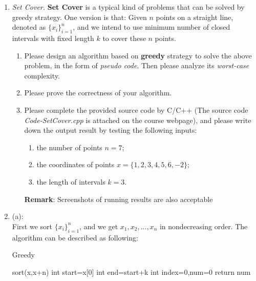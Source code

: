\documentclass[12pt,a4paper]{article}
\makeatletter
\newtheorem*{solution}{Solution}
\theoremstyle{definition}
\renewenvironment{solution}[1][Solution] {\par\pushQED{\qed}\normalfont\topsep6\p@\@plus6\p@\relax\trivlist\item[\hskip\labelsep\bfseries#1\@addpunct{.}]\ignorespaces}{\popQED\endtrivlist\@endpefalse} \makeatother
\makeatother
\begin{document}
\begin{enumerate}
    \item \textit{Set Cover.} \textbf{Set Cover} is a typical kind of problems that can be solved by greedy strategy. One version is that: Given $n$ points on a straight line, denoted as $\{x_i\}_{i=1}^n$, and we intend to use minimum number of closed intervals with fixed length $k$ to cover these $n$ points.
    \begin{enumerate}
    	\item Please design an algorithm based on \textbf{greedy} strategy to solve the above problem, in the form of \emph{pseudo code}. Then please analyze its \emph{worst-case} complexity.
    	\item Please prove the correctness of your algorithm.
    	\item Please complete the provided source code by C/C++ {\color{blue}(The source code \emph{Code-SetCover.cpp} is attached on the course webpage)}, and please write down the output result by testing the following inputs: 
    	\begin{enumerate}
    		\item the number of points $n=7$;
    		\item the coordinates of points
    		$x=\{1,2,3,4,5,6,-2\}$;
    		\item the length of intervals
    		$k=3$.
    	\end{enumerate}
        \textbf{Remark}: Screenshots of running results are also acceptable 
    \end{enumerate}
    \begin{solution}
        (a):\\
        
        First we sort $\{x_i\}_{i=1}^n$, and we get ${x_1,x_2,...,x_n}$ in nondecreasing order. The algorithm can be described as following: \\
        
	\begin{algorithm}[H]
		
		\BlankLine
		\caption{Greedy}\label{Alg-greedy}
		
		sort(x,x+n)\;
        int start=x[0]\;
        int end=start+k\;
        int index=0,num=0\;
        return num\;
		

\end{algorithm}
\end{solution}
\end{enumerate}
\end{document}
